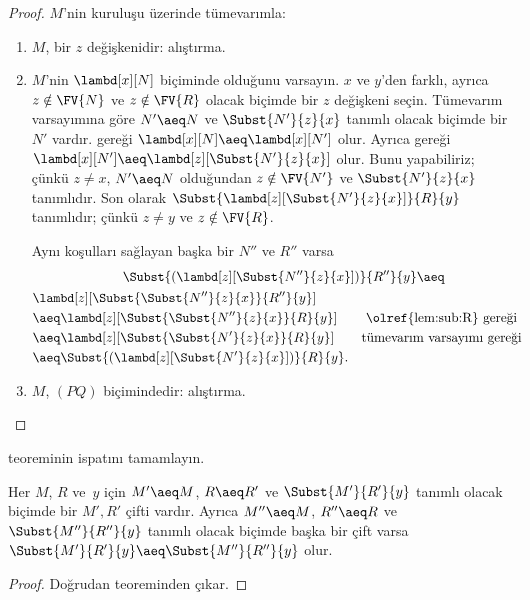 \documentclass[../../../include/open-logic-section]{subfiles}
\begin{document}
\begin{proof}
  $M$'nin kuruluşu üzerinde tümevarımla:
  \begin{enumerate}
  \item $M$, bir $z$ değişkenidir: alıştırma.
  \item $M$'nin $\lambd[x][N]$ biçiminde olduğunu varsayın. $x$ ve $y$'den
    farklı, ayrıca $z\notin\FV{N}$ ve $z\notin\FV{R}$ olacak biçimde bir
    $z$ değişkeni seçin. Tümevarım varsayımına göre $N'\aeq N$ ve
    $\Subst{N'}{z}{x}$ tanımlı olacak biçimde bir $N'$ vardır.
     gereği
    $\lambd[x][N]\aeq\lambd[x][N']$ olur. Ayrıca
     gereği
    $\lambd[x][N']\aeq\lambd[z][\Subst{N'}{z}{x}]$ olur. Bunu yapabiliriz;
    çünkü $z\neq x$, $N'\aeq N$ olduğundan $z\notin\FV{N'}$ ve
    $\Subst{N'}{z}{x}$ tanımlıdır. Son olarak
    $\Subst{\lambd[z][\Subst{N'}{z}{x}]}{R}{y}$ tanımlıdır; çünkü
    $z\neq y$ ve $z\notin\FV{R}$.

    Aynı koşulları sağlayan başka bir $N''$ ve $R''$ varsa
    \begin{multline*}
      \Subst{(\lambd[z][\Subst{N''}{z}{x}])}{R''}{y} \aeq\\
    \begin{aligned}
      &\lambd[z][\Subst{\Subst{N''}{z}{x}}{R''}{y}] \\
      &\aeq \lambd[z][\Subst{\Subst{N''}{z}{x}}{R}{y}] && \text{
        \olref{lem:sub:R} gereği}\\
      &\aeq\lambd[z][\Subst{\Subst{N'}{z}{x}}{R}{y}]
      && \text{tümevarım varsayımı gereği}\\
      &\aeq\Subst{(\lambd[z][\Subst{N'}{z}{x}])}{R}{y}.
    \end{aligned}
    \end{multline*}
    \item $M$, $(PQ)$ biçimindedir: alıştırma.
  \end{enumerate}
\end{proof}

\begin{prob}
   teoreminin ispatını tamamlayın.
\end{prob}

\begin{cor}
  Her $M$, $R$ ve~$y$ için $M'\aeq M$, $R\aeq R'$ ve
  $\Subst{M'}{R'}{y}$ tanımlı olacak biçimde bir $M',R'$ çifti vardır.
  Ayrıca $M''\aeq M$, $R''\aeq R$ ve $\Subst{M''}{R''}{y}$ tanımlı olacak
  biçimde başka bir çift varsa
  $\Subst{M'}{R'}{y}\aeq\Subst{M''}{R''}{y}$ olur.
\end{cor}

\begin{proof}
  Doğrudan  teoreminden çıkar.
\end{proof}
\end{document}

